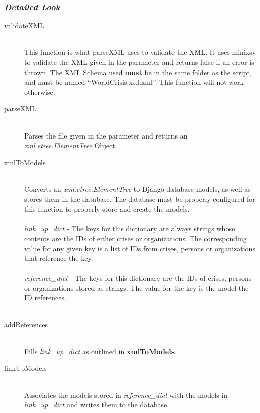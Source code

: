 \documentclass[12pt]{report}
\begin{document}
\subsubsection*{\emph{Detailed Look}}
\begin{description}
    \item[validateXML] \hfill \\
        This function is what parseXML uses to validate the XML.
        It uses minixsv to validate the XML given in the parameter and returns false if an error is thrown.
        The XML Schema used \textbf{must} be in the same folder as the script, and must be named ``WorldCrisis.xsd.xml''.
        This function will not work otherwise.\\
    \item[parseXML] \hfill \\
        Parses the file given in the parameter and returns an \emph{xml.etree.ElementTree} Object.\\
    \item[xmlToModels] \hfill \\
        Converts an \emph{xml.etree.ElementTree} to Django database models, as well as stores them in the database.
        The database must be properly configured for this function to properly store and create the models.\\\\
        \emph{link\_up\_dict} -
            The keys for this dictionary are always strings whose contents are the IDs of either crises or organizations.
            The corresponding value for any given key is a list of IDs from crises, persons or organizations that reference the key.\\\\
        \emph{reference\_dict} -
            The keys for this dictionary are the IDs of crises, persons or organizations stored as strings.
            The value for the key is the model the ID references.\\\\
    \item[addReferences] \hfill \\
        Fills \emph{link\_up\_dict} as outlined in \textbf{xmlToModels}.\\


    \item[linkUpModels] \hfill \\
        Associates the models stored in \emph{reference\_dict} with the models in \emph{link\_up\_dict} and writes them to the database.
\end{description}
\end{document}
